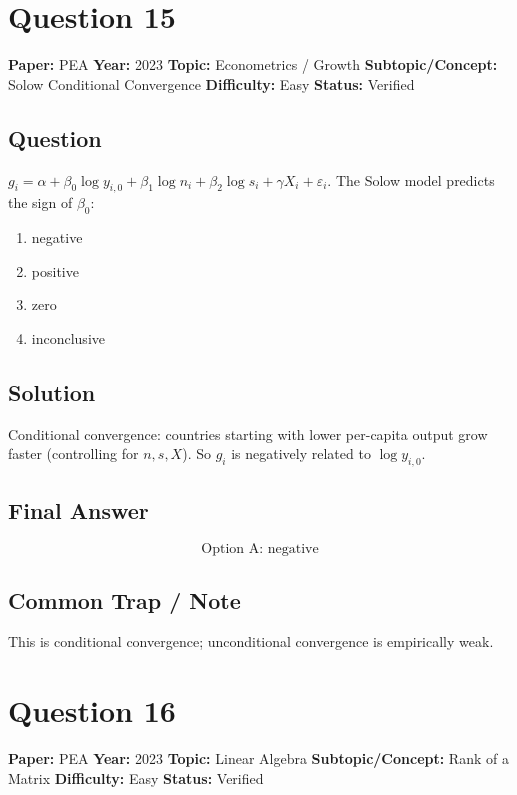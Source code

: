 \documentclass[11pt]{article}
\begin{document}
\medskip

\section*{Question 15}
\textbf{Paper:} PEA \quad \textbf{Year:} 2023 \quad \textbf{Topic:} Econometrics / Growth \quad \textbf{Subtopic/Concept:} Solow Conditional Convergence \quad \textbf{Difficulty:} Easy \quad \textbf{Status:} Verified

\subsection*{Question}
$g_i=\alpha+\beta_0\log y_{i,0}+\beta_1\log n_i+\beta_2\log s_i+\gamma X_i+\varepsilon_i$. The Solow model predicts the sign of $\beta_0$:
\begin{enumerate}[label=(\Alph*)]
\item negative \item positive \item zero \item inconclusive
\end{enumerate}

\subsection*{Solution}
Conditional convergence: countries starting with lower per-capita output grow faster (controlling for $n,s,X$). So $g_i$ is negatively related to $\log y_{i,0}$.

\subsection*{Final Answer}
\[
\boxed{\text{Option A: negative}}
\]

\subsection*{Common Trap / Note}
This is conditional convergence; unconditional convergence is empirically weak.

\medskip

\section*{Question 16}
\textbf{Paper:} PEA \quad \textbf{Year:} 2023 \quad \textbf{Topic:} Linear Algebra \quad \textbf{Subtopic/Concept:} Rank of a Matrix \quad \textbf{Difficulty:} Easy \quad \textbf{Status:} Verified
\end{document}
